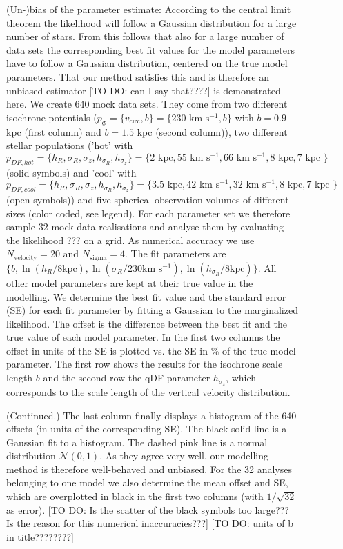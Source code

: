 \begin{figure}
\caption{(Un-)bias of the parameter estimate: According to the central limit theorem the likelihood will follow a Gaussian distribution for a large number of stars. From this follows that also for a large number of data sets the corresponding best fit values for the model parameters have to follow a Gaussian distribution, centered on the true model parameters. That our method satisfies this and is therefore an unbiased estimator [TO DO: can I say that????] is demonstrated here. We create 640 mock data sets. They come from two different isochrone potentials ($p_\Phi = \{v_\text{circ},b \}=\{230 \text{ km s$^{-1}$},b \}$ with $b = 0.9$ kpc (first column) and $b = 1.5$ kpc (second column)), two different stellar populations ('hot' with $p_{DF,hot} = \{ h_R, \sigma_R, \sigma_z,h_{\sigma_R},h_{\sigma_z}\} =\{2 \text{ kpc}, 55 \text{ km s$^{-1}$}, 66 \text{ km s$^{-1}$}, 8 \text{ kpc}, 7 \text{ kpc }\} $ (solid symbols) and 'cool' with $p_{DF,cool} = \{ h_R, \sigma_R, \sigma_z,h_{\sigma_R},h_{\sigma_z}\} =\{3.5 \text{ kpc}, 42 \text{ km s$^{-1}$}, 32 \text{ km s$^{-1}$}, 8 \text{ kpc}, 7 \text{ kpc }\} $ (open symbols)) and five spherical observation volumes of different sizes (color coded, see legend). For each parameter set we therefore sample 32 mock data realisations and analyse them by evaluating the likelihood ??? on a grid. As numerical accuracy we use $N_\text{velocity} = 20$ and $N_\text{sigma} = 4$. The fit parameters are $\{b,\ln(h_R/8\text{kpc}),\ln(\sigma_{R}/230 \text{km s$^{-1}$}),\ln(h_{\sigma_R}/8\text{kpc}) \}$. All other model parameters are kept at their true value in the modelling. We determine the best fit value and the standard error (SE) for each fit parameter by fitting a Gaussian to the marginalized likelihood. The offset is the difference between the best fit and the true value of each model parameter. In the first two columns the offset in units of the SE is plotted vs. the SE in \% of the true model parameter. The first row shows the results for the isochrone scale length $b$ and the second row the qDF parameter $h_{\sigma_z}$, which corresponds to the scale length of the vertical velocity distribution. }
\label{fig:centrallimittheorem}
\end{figure}

\addtocounter{figure}{-1}
\begin{figure} [t!]
  \caption{(Continued.) The last column finally displays a histogram of the 640 offsets (in units of the corresponding SE). The black solid line is a Gaussian fit to a histogram. The dashed pink line is a normal distribution $\mathscr{N}(0,1)$. As they agree very well, our modelling method is therefore well-behaved and unbiased. For the 32 analyses belonging to one model we also determine the mean offset and SE, which are overplotted in black in the first two columns (with $1/\sqrt{32}$ as error).  [TO DO: Is the scatter of the black symbols too large??? Is the reason for this numerical inaccuracies???] [TO DO: units of b in title????????]} 
  \end{figure}
  
